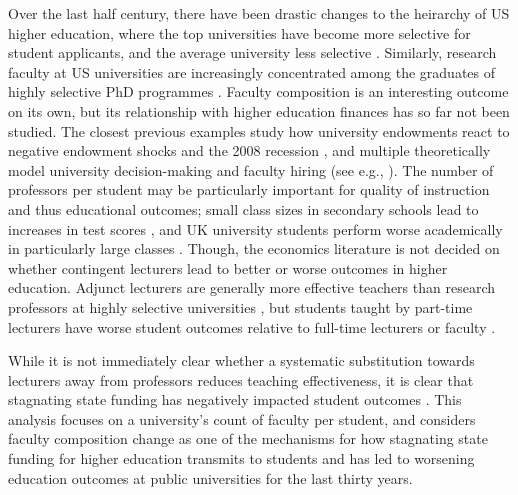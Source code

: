 Over the last half century, there have been drastic changes to the heirarchy of US higher education, where the top universities have become more selective for student applicants, and the average university less selective \citep{hoxby2009changing}.
Similarly, research faculty at US universities are increasingly concentrated among the graduates of highly selective PhD programmes \citep{wapman2022quantifying}.
Faculty composition is an interesting outcome on its own, but its relationship with higher education finances has so far not been studied.
The closest previous examples study  how university endowments react to negative endowment shocks \citep{brown2014endowment} and the 2008 recession \citep{turner2014impact}, and multiple theoretically model university decision-making and faculty hiring (see e.g., \citealt{abe2015implications,johnson2009jep,NBERc13879}).
The number of professors per student may be particularly important for quality of instruction and thus educational outcomes;
small class sizes in secondary schools lead to increases in test scores \citep{angrist1999using}, and UK university students perform worse academically in particularly large classes \citep{bandiera2010heterogeneous}.
Though, the economics literature is not decided on whether contingent lecturers lead to better or worse outcomes in higher education.
Adjunct lecturers are generally more effective teachers than research professors at highly selective universities \citep{bettinger2010does,figlio2015tenure}, but students taught by part-time lecturers have worse student outcomes relative to full-time lecturers or faculty \citep{zhu2021limited,ehrenberg2005tenured}.

While it is not immediately clear whether a systematic substitution towards lecturers away from professors reduces teaching effectiveness, it is clear that stagnating state funding has negatively impacted student outcomes \citep{NBERw23736,NBERw27885}.
This analysis focuses on a university's count of faculty per student, and considers faculty composition change as one of the mechanisms for how stagnating state funding for higher education transmits to students and has led to worsening education outcomes at public universities for the last thirty years.
